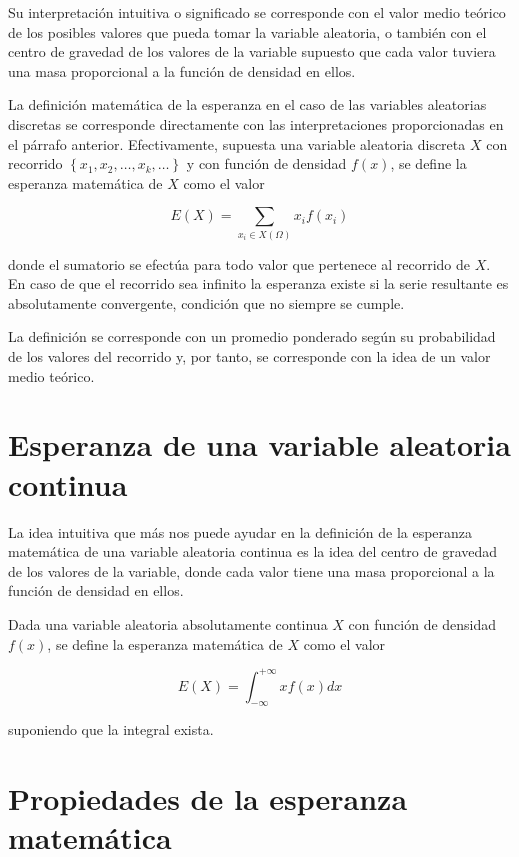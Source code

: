 \documentclass[
  a4paper,
  DIV=11,
  numbers=noendperiod]{scrreprt}
\begin{document}
Su interpretación intuitiva o significado se corresponde con el valor
medio teórico de los posibles valores que pueda tomar la variable
aleatoria, o también con el centro de gravedad de los valores de la
variable supuesto que cada valor tuviera una masa proporcional a la
función de densidad en ellos.

La definición matemática de la esperanza en el caso de las variables
aleatorias discretas se corresponde directamente con las
interpretaciones proporcionadas en el párrafo anterior. Efectivamente,
supuesta una variable aleatoria discreta \(X\) con recorrido
\(\left\{x_{1}, x_{2}, \ldots, x_{k}, \ldots\right\}\) y con función de
densidad \(f(x)\), se define la esperanza matemática de \(X\) como el
valor

\[
E(X)=\sum_{x_{i} \in X(\Omega)} x_{i} f\left(x_{i}\right)
\]

donde el sumatorio se efectúa para todo valor que pertenece al recorrido
de \(X\). En caso de que el recorrido sea infinito la esperanza existe
si la serie resultante es absolutamente convergente, condición que no
siempre se cumple.

La definición se corresponde con un promedio ponderado según su
probabilidad de los valores del recorrido y, por tanto, se corresponde
con la idea de un valor medio teórico.

\section{Esperanza de una variable aleatoria
continua}\label{esperanza-de-una-variable-aleatoria-continua}

La idea intuitiva que más nos puede ayudar en la definición de la
esperanza matemática de una variable aleatoria continua es la idea del
centro de gravedad de los valores de la variable, donde cada valor tiene
una masa proporcional a la función de densidad en ellos.

Dada una variable aleatoria absolutamente continua \(X\) con función de
densidad \(f(x)\), se define la esperanza matemática de \(X\) como el
valor

\[
E(X)=\int_{-\infty}^{+\infty} x f(x) d x
\]

suponiendo que la integral exista.

\section{Propiedades de la esperanza
matemática}\label{propiedades-de-la-esperanza-matemuxe1tica}
\end{document}
